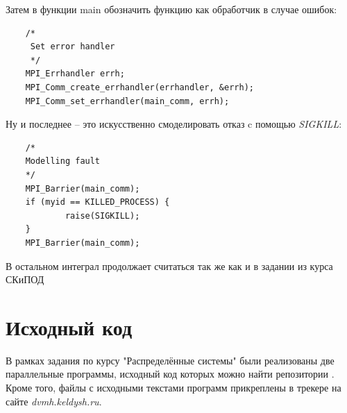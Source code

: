 \documentclass[a4paper]{article}
\begin{document}
\newpage
Затем в функции main обозначить функцию как обработчик в случае ошибок:
\begin{lstlisting}
 	/*
     Set error handler
     */
    MPI_Errhandler errh;
    MPI_Comm_create_errhandler(errhandler, &errh);
    MPI_Comm_set_errhandler(main_comm, errh);
\end{lstlisting}

Ну и последнее -- это искусственно смоделировать отказ c помощью \textit{SIGKILL}:\\ 
\begin{lstlisting}
	/*
    Modelling fault
    */
    MPI_Barrier(main_comm);
    if (myid == KILLED_PROCESS) {
            raise(SIGKILL);
    }
    MPI_Barrier(main_comm);

\end{lstlisting}


В остальном интеграл продолжает считаться так же как и в задании из курса СКиПОД


\section{Исходный код}
В рамках задания по курсу "Распределённые системы" были реализованы две параллельные программы, исходный код которых можно найти репозитории \textit{}. Кроме того, файлы с исходными текстами программ прикреплены в трекере на сайте \textit{dvmh.keldysh.ru}.
\end{document}
